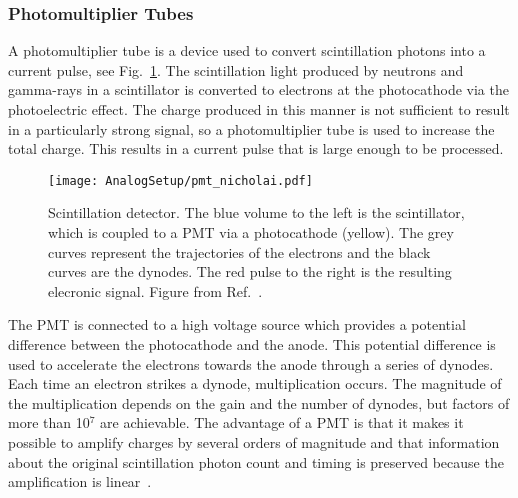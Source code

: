 \documentclass[main.tex]{subfiles}
\begin{document}
\subsubsection{Photomultiplier Tubes}
A photomultiplier tube is a device used to convert scintillation photons into a current pulse, see Fig.~\ref{fig:pmt}. The scintillation light produced by neutrons and gamma-rays in a scintillator is converted to electrons at the photocathode via the photoelectric effect. The charge produced in this manner is not sufficient to result in a particularly strong signal, so a photomultiplier tube is used to increase the total charge. This results in a current pulse that is large enough to be processed. 

\begin{figure}[ht]
	\centering
    	\texttt{[image: AnalogSetup/pmt\_nicholai.pdf]}
        \caption[Scintillation detector.]{Scintillation detector. The blue volume to the left is the scintillator, which is coupled to a PMT via a photocathode (yellow). The grey curves represent the trajectories of the electrons and the black curves are the dynodes. The red pulse to the right is the resulting elecronic signal. Figure from Ref.~\cite{Mauritzsson}.}
	    \label{fig:pmt} 
\end{figure}

The PMT is connected to a high voltage source which provides a potential difference between the photocathode and the anode. This potential difference is used to accelerate the electrons towards the anode through a series of dynodes. Each time an electron strikes a dynode, multiplication occurs. 
The magnitude of the multiplication depends on the gain and the number of dynodes, but factors of more than 10$^\text{7}$ are achievable. 
The advantage of a PMT is that it makes it possible to amplify charges by several orders of magnitude and that information about the original scintillation photon count and timing is preserved because the amplification is linear~\cite{Leo}.
\end{document}
